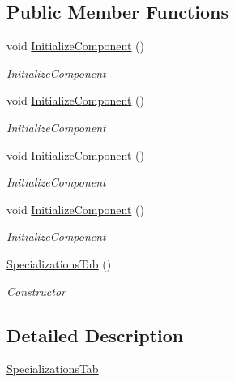 \subsection*{Public Member Functions}
\begin{DoxyCompactItemize}
\item 
void \hyperlink{class_baudi_1_1_client_1_1_view_1_1_tabs_1_1_specializations_tab_ae79428516d903bf19144156e80fb48b3}{Initialize\+Component} ()
\begin{DoxyCompactList}\small\item\em Initialize\+Component \end{DoxyCompactList}\item 
void \hyperlink{class_baudi_1_1_client_1_1_view_1_1_tabs_1_1_specializations_tab_ae79428516d903bf19144156e80fb48b3}{Initialize\+Component} ()
\begin{DoxyCompactList}\small\item\em Initialize\+Component \end{DoxyCompactList}\item 
void \hyperlink{class_baudi_1_1_client_1_1_view_1_1_tabs_1_1_specializations_tab_ae79428516d903bf19144156e80fb48b3}{Initialize\+Component} ()
\begin{DoxyCompactList}\small\item\em Initialize\+Component \end{DoxyCompactList}\item 
void \hyperlink{class_baudi_1_1_client_1_1_view_1_1_tabs_1_1_specializations_tab_ae79428516d903bf19144156e80fb48b3}{Initialize\+Component} ()
\begin{DoxyCompactList}\small\item\em Initialize\+Component \end{DoxyCompactList}\item 
\hyperlink{class_baudi_1_1_client_1_1_view_1_1_tabs_1_1_specializations_tab_afaefd09885f015cc7dfca69b73216b35}{Specializations\+Tab} ()
\begin{DoxyCompactList}\small\item\em Constructor \end{DoxyCompactList}\end{DoxyCompactItemize}


\subsection{Detailed Description}
\hyperlink{class_baudi_1_1_client_1_1_view_1_1_tabs_1_1_specializations_tab}{Specializations\+Tab} 

